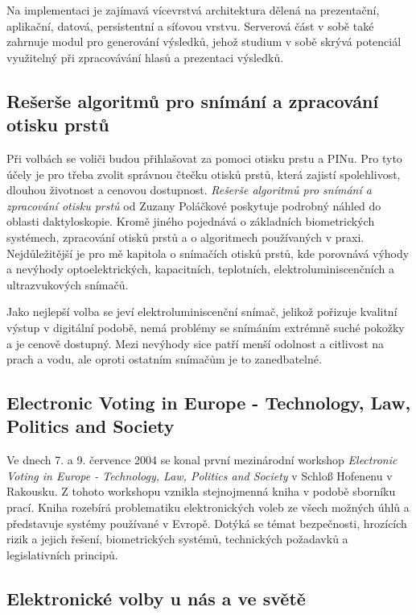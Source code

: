 \documentclass[11pt,twoside,a4paper]{book}
\begin{document}
Na implementaci je zajímavá vícevrstvá architektura dělená na prezentační, aplikační, datová, persistentní a síťovou vrstvu. Serverová část v sobě také zahrnuje modul pro generování výsledků, jehož studium v sobě skrývá potenciál využitelný při zpracovávání hlasů a prezentaci výsledků.

\subsection{Rešerše algoritmů pro snímání a zpracování otisku prstů} \label{sec:reserse_otisky}

Při volbách se voliči budou přihlašovat za pomoci otisku prstu a PINu. Pro tyto účely je pro třeba zvolit správnou čtečku otisků prstů, která zajistí spolehlivost, dlouhou životnost a cenovou dostupnost. \textit{Rešerše algoritmů pro snímání a zpracování otisku prstů} \cite{art:polackova} od Zuzany Poláčkové poskytuje podrobný náhled do oblasti daktyloskopie. Kromě jiného pojednává o základních biometrických systémech, zpracování otisků prstů a o algoritmech používaných v praxi. Nejdůležitější je pro mě kapitola o snímačích otisků prstů, kde porovnává výhody a nevýhody optoelektrických, kapacitních, teplotních, elektroluminiscenčních a ultrazvukových snímačů.

Jako nejlepší volba se jeví elektroluminiscenční snímač, jelikož pořizuje kvalitní výstup v digitální podobě, nemá problémy se snímáním extrémně suché pokožky a je cenově dostupný. Mezi nevýhody sice patří menší odolnost a citlivost na prach a vodu, ale oproti ostatním snímačům je to zanedbatelné.

\subsection{Electronic Voting in Europe - Technology, Law, Politics and Society}

Ve dnech 7. a 9. července 2004 se konal první mezinárodní workshop \textit{Electronic Voting in Europe - Technology, Law, Politics and Society} \cite{book:prosser} v Schloß Hofenenu v Rakousku. Z tohoto workshopu vznikla stejnojmenná kniha v podobě sborníku prací. Kniha rozebírá problematiku elektronických voleb ze všech možných úhlů a představuje systémy používané v Evropě. Dotýká se témat bezpečnosti, hrozících rizik a jejich řešení, biometrických systémů, technických požadavků a legislativních principů.

\subsection{Elektronické volby u nás a ve světě}
\end{document}
